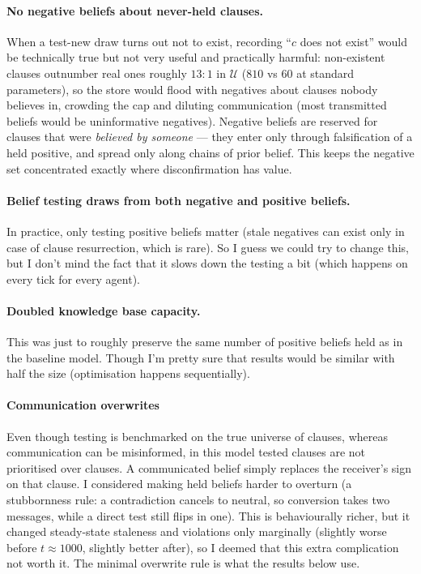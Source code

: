 \documentclass{article}
\begin{document}
\paragraph{No negative beliefs about never-held clauses.} When a test-new draw turns out not to exist, recording ``$c$ does not exist'' would be technically true but not very useful and practically harmful: non-existent clauses outnumber real ones roughly $13{:}1$ in $\mathcal{U}$ ($810$ vs $60$ at standard parameters), so the store would flood with negatives about clauses nobody believes in, crowding the cap and diluting communication (most transmitted beliefs would be uninformative negatives). Negative beliefs are reserved for clauses that were \emph{believed by someone} --- they enter only through falsification of a held positive, and spread only along chains of prior belief. This keeps the negative set concentrated exactly where disconfirmation has value.

\paragraph{Belief testing draws from both negative and positive beliefs.} In practice, only testing positive beliefs matter (stale negatives can exist only in case of clause resurrection, which is rare). So I guess we could try to change this, but I don't mind the fact that it slows down the testing a bit (which happens on every tick for every agent).

\paragraph{Doubled knowledge base capacity.} This was just to roughly preserve the same number of positive beliefs held as in the baseline model. Though I'm pretty sure that results would be similar with half the size (optimisation happens sequentially).

\paragraph{Communication overwrites} Even though testing is benchmarked on the true universe of clauses, whereas communication can be misinformed, in this model tested clauses are not prioritised over clauses. A communicated belief simply replaces the receiver's sign on that clause. I considered making held beliefs harder to overturn (a stubbornness rule: a contradiction cancels to neutral, so conversion takes two messages, while a direct test still flips in one). This is behaviourally richer, but it changed steady-state staleness and violations only marginally (slightly worse before $t \approx 1000$, slightly better after), so I deemed that this extra complication not worth it. The minimal overwrite rule is what the results below use.
\end{document}
